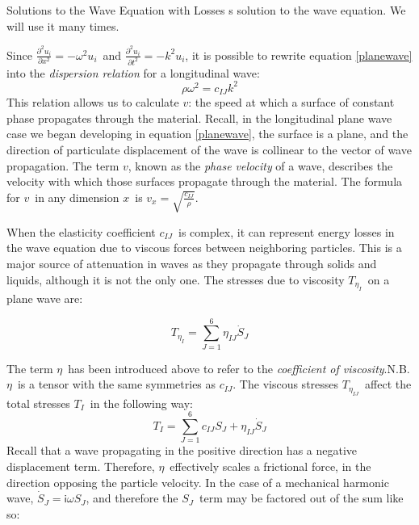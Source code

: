 \documentclass[a4paper,10pt]{report}
\numberwithin{equation}{section}
\begin{document}
{\begin{chapter}
\begin{section}{Solutions to the Wave Equation with Losses}
{s 
solution} to the wave equation. We will use it many times.\cite[p.~119]{Cremer1973}
\par
Since $\frac{\partial^2 u_i}{\partial x^2} = -\omega^2 u_{i}$\  and $\frac{\partial^2 u_i}{\partial t^2} = -k^2 u_{i}$, it is possible to rewrite equation \eqref{planewave} into the \emph{dispersion relation} for a longitudinal wave\cite[p.~20]{Ballantine1997}:
\begin{equation}
 \rho \omega^2 = c_{IJ}k^2
\end{equation}
\footnotemark  This relation allows us to calculate $v$: the speed at which a surface of constant phase propagates through the material. Recall, in the longitudinal plane wave case we began developing in equation \eqref{planewave}, the surface is a plane, and the direction of particulate displacement of the wave is collinear to the vector of wave propagation. The term $v$, known as the \emph{phase velocity} of a wave, describes the velocity with which those surfaces propagate through the material. The formula for $v$\  in any dimension $x$\  is $v_x = \sqrt{\frac{c_{IJ}}{\rho}}$. \cite[p.~20]{Ballantine1997}
\par
When the elasticity coefficient $c_{IJ}$\  is complex, it can represent energy losses in the wave equation due to viscous forces between neighboring particles. This is a major source of attenuation in waves as they propagate through solids and liquids, although it is not the only one. The stresses due to viscosity $T_{\eta_I}$\  on a plane wave are\cite[p.~8]{Kino1987}\cite[p.~21]{Ballantine1997}:
\par
\begin{equation}
 T_{\eta_{I}} = \sum_{J=1}^6\eta_{IJ} \dot{S}_{J}
\end{equation}
\par
The term $\eta$\  has been introduced above to refer to the \emph{coefficient of viscosity}.\footnotemark  N.B. $\eta$\  is a tensor with the same symmetries as $c_{IJ}$. The viscous stresses $T_{\eta_{IJ}}$\  affect the total stresses $T_I$\  in the following way:
\begin{equation}
 T_I = \sum_{J=1}^6 c_{IJ}S_J + \eta_{IJ} \dot{S}_{J}
\end{equation}
Recall that a wave propagating in the positive direction has a negative displacement term. Therefore, $\eta$\  effectively scales a frictional force, in the direction opposing the particle velocity. In the case of a mechanical harmonic wave, $\dot{S}_{J} = \mathsf{i}\omega S_{J}$, and therefore the $S_{J}$\  term may be factored out of the sum like so:

\end{section}
\end{chapter}}
\end{document}
